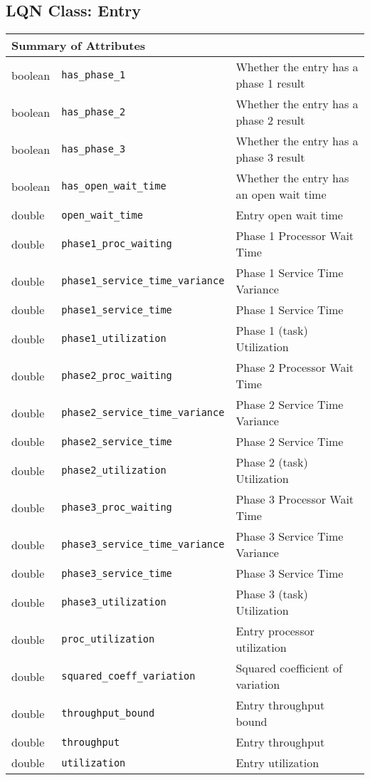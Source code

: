\subsection{LQN Class: Entry}
\begin{tabular}{|p{1.0in}|p{2.3in}||p{2.8in}|}
  \hline
  \multicolumn{3}{|l|}{\textbf{Summary of Attributes}}\\
  \hline
  boolean & {\tt has\_phase\_1} & Whether the entry has a phase 1 result\\
  boolean & {\tt has\_phase\_2} & Whether the entry has a phase 2 result\\
  boolean & {\tt has\_phase\_3} & Whether the entry has a phase 3 result\\
  boolean & {\tt has\_open\_wait\_time} & Whether the entry has an open wait time\\
  double & {\tt open\_wait\_time} & Entry open wait time\\
  double & {\tt phase1\_proc\_waiting} & Phase 1 Processor Wait Time\\
  double & {\tt phase1\_service\_time\_variance} & Phase 1 Service Time Variance\\
  double & {\tt phase1\_service\_time} & Phase 1 Service Time\\
  double & {\tt phase1\_utilization} & Phase 1 (task) Utilization\\
  double & {\tt phase2\_proc\_waiting} & Phase 2 Processor Wait Time\\
  double & {\tt phase2\_service\_time\_variance} & Phase 2 Service Time Variance\\
  double & {\tt phase2\_service\_time} & Phase 2 Service Time\\
  double & {\tt phase2\_utilization} & Phase 2 (task) Utilization\\
  double & {\tt phase3\_proc\_waiting} & Phase 3 Processor Wait Time\\
  double & {\tt phase3\_service\_time\_variance} & Phase 3 Service Time Variance\\
  double & {\tt phase3\_service\_time} & Phase 3 Service Time\\
  double & {\tt phase3\_utilization} & Phase 3 (task) Utilization\\
  double & {\tt proc\_utilization} & Entry processor utilization\\
  double & {\tt squared\_coeff\_variation} & Squared coefficient of variation\\
  double & {\tt throughput\_bound} & Entry throughput bound\\
  double & {\tt throughput} & Entry throughput\\
  double & {\tt utilization} & Entry utilization\\
  \hline
\end{tabular}

